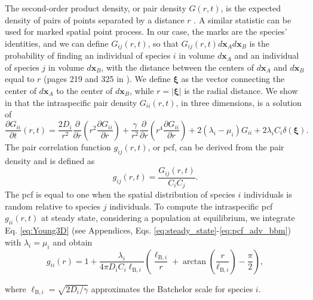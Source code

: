 \documentclass[12pt,english]{article}
\newcommand{\ellB}{\ell_{\mathrm{B},i}}
\begin{document}
The second-order product density, or pair density $G(r,t)$, is the
expected density of pairs of points separated by a distance $r$ \citep{law_population_2003}.
A similar statistic can be used for marked spatial point process. In our case, the marks are the species' identities, and we can define $G_{ij}(r,t)$, so that $G_{ij}(r,t)d\mathbf{x}_{A}d\mathbf{x}_{B}$
is the probability of finding an individual of species $i$ in volume
$d\mathbf{x}_{A}$ and an individual of species $j$ in volume $d\mathbf{x}_{B}$, with the distance between the centers of $d\mathbf{x}_{A}$ and $d\mathbf{x}_{B}$ equal to $r$ (pages 219 and 325 in \citealp{illian2008statistical}).
We define $\boldsymbol{\xi}$ as the vector connecting the center
of $d\mathbf{x}_{A}$ to the center of $d\mathbf{x}_{B}$, while $r=|\boldsymbol{\xi}|$
is the radial distance. We show in \citet{picoche_rescience_2022}
that the intraspecific pair density $G_{ii}(r,t)$, in three dimensions,
is a solution of 
\begin{equation}
\frac{\partial G_{ii}}{\partial t}(r,t)=\frac{2D_{i}}{r^{2}}\frac{\partial}{\partial r}\left(r^{2}\frac{\partial G_{ii}}{\partial r}\right)+\frac{\gamma}{r^{2}}\frac{\partial}{\partial r}\left(r^{4}\frac{\partial G_{ii}}{\partial r}\right)+2(\lambda_{i}-\mu_{i})G_{ii}+2\lambda_{i}C_{i}\delta(\boldsymbol{\xi}).\label{eq:Young3D}
\end{equation}
The pair correlation function $g_{ij}(r,t)$, or pcf, can be derived
from the pair density and is defined as 
\begin{equation}
g_{ij}(r,t)=\frac{G_{ij}(r,t)}{C_{i}C_{j}}.\label{eq:def_pcf}
\end{equation}
The pcf is equal to one when the spatial distribution of species $i$
individuals is random relative to species $j$ individuals. To compute
the intraspecific pcf $g_{ii}(r,t)$ at steady state, considering
a population at equilibrium, we integrate Eq. \ref{eq:Young3D} (see
Appendices, Eqs. \ref{eq:steady_state}-\ref{eq:pcf_adv_bbm}) with
$\lambda_{i}=\mu_{i}$ and obtain 
\begin{equation}
g_{ii}(r)=1+\frac{\lambda_{i}}{4\pi D_{i}C_{i}\ellB}\left(\frac{\ellB}{r}+\arctan\left(\frac{r}{\ellB}\right)-\frac{\pi}{2}\right),\label{eq:pcf_intra_adv}
\end{equation}

where $\ellB=\sqrt{2D_{i}/\gamma}$ approximates the Batchelor scale
for species $i$.
\end{document}
